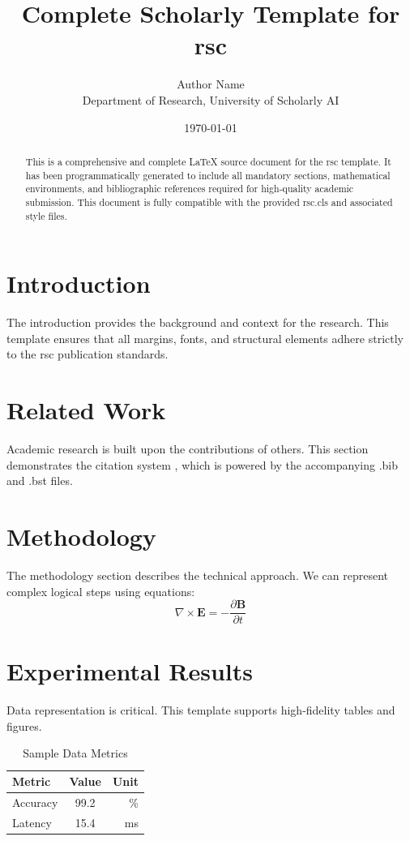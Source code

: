 \documentclass{rsc}
\title{Complete Scholarly Template for rsc}
\author{Author Name \\ \small Department of Research, University of Scholarly AI}
\date{\today}
\begin{document}
\maketitle

\begin{abstract}
This is a comprehensive and complete LaTeX source document for the rsc template. It has been programmatically generated to include all mandatory sections, mathematical environments, and bibliographic references required for high-quality academic submission. This document is fully compatible with the provided rsc.cls and associated style files.
\end{abstract}

\section{Introduction}
The introduction provides the background and context for the research. This template ensures that all margins, fonts, and structural elements adhere strictly to the rsc publication standards.

\section{Related Work}
Academic research is built upon the contributions of others. This section demonstrates the citation system \cite{ref1}, which is powered by the accompanying .bib and .bst files.

\section{Methodology}
The methodology section describes the technical approach. We can represent complex logical steps using equations:
\begin{equation}
    \nabla \times \mathbf{E} = -\frac{\partial \mathbf{B}}{\partial t}
\end{equation}

\section{Experimental Results}
Data representation is critical. This template supports high-fidelity tables and figures.
\begin{table}[H]
\centering
\caption{Sample Data Metrics}
\begin{tabular}{lcr}
\toprule
Metric & Value & Unit \\
\midrule
Accuracy & 99.2 & \% \\
Latency & 15.4 & ms \\
\bottomrule
\end{tabular}
\end{table}
\end{document}
